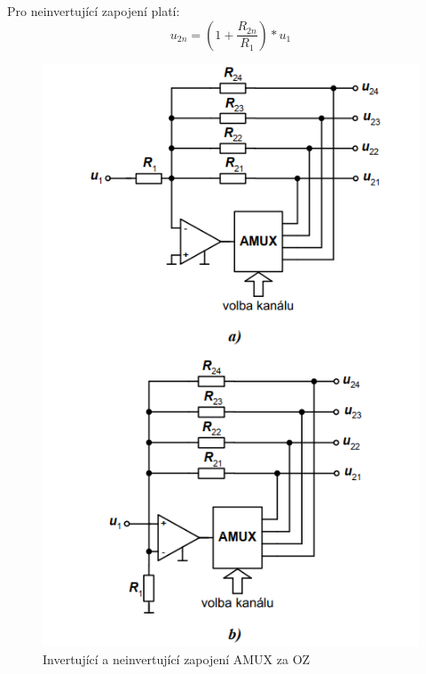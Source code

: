 Pro neinvertující zapojení platí:
\begin{equation}
u_{2n}=(1+\frac{R_{2n}}{R_{1}})*u_{1}
\end{equation}

\begin{figure}[h]
   \begin{center}
     \includegraphics[scale=0.6]{images/Amux7.png}
   \end{center}
   \caption{Invertující a neinvertující zapojení AMUX za OZ}
\end{figure}

